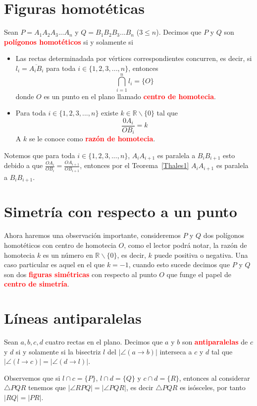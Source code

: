 \section{Figuras homotéticas}
\begin{df}\label{PHdf}
Sean $P=A_{1}A_{2}A_{3}...A_{n}$ y $Q=B_{1}B_{2}B_{3}...B_{n}$ ($3\leq n$). 
Decimos que $P$ y $Q$ son \textcolor{red}{\bf polígonos homotéticos} si y solamente si
\begin{itemize}
\item Las rectas determinadada por vértices correspondientes concurren, es decir, si $l_{i}=\overline{A_{i}B_{i}}$ para toda $i\in\{1,2,3,...,n\}$, entonces 
$$\bigcap_{i=1}^{n}l_{i}=\{O\}$$
donde $O$ es un punto en el plano llamado \textcolor{red}{\bf centro de homotecia}.
\item Para toda $i\in\{1,2,3,...,n\}$ existe $k\in\mathbb{R}\backslash\{0\}$ tal que
$$\frac{0A_{i}}{OB_{i}}=k$$
A $k$ se le conoce como \textcolor{red}{\bf razón de homotecia}.
\end{itemize}
\end{df}

Notemos que para toda $i\in\{1,2,3,...,n\}$, $A_{i}A_{i+1}$ es paralela a $B_{i}B_{i+1}$
esto debido a que $\frac{OA_{i}}{OB_{i}}=\frac{OA_{i+1}}{OB_{i+1}}$, entonces por el Teorema~\ref{Thales1} $A_{i}A_{i+1}$ es paralela a $B_{i}B_{i+1}$.

\section{Simetría con respecto a un punto}

Ahora haremos una observación importante, consideremos $P$ y $Q$ dos polígonos homotéticos con centro de homotecia $O$, como el lector podrá notar, la razón de homotecia $k$ es un número en $\mathbb{R}\backslash \{0\}$, es decir, $k$ puede positiva o negativa. 
Una caso particular es aquel en el que $k=-1$, cuando esto sucede decimos que $P$ y $Q$ son dos \textcolor{red}{\bf figuras simétricas} con respecto al punto $O$ que funge el papel de \textcolor{red}{\bf centro de simetría}.

\section{Líneas antiparalelas}
\begin{df}
Sean $a,b,c,d$ cuatro rectas en el plano. Decimos que $a$ y $b$ son \textcolor{red}{\bf antiparalelas} de $c$ y $d$ si y solamente si la bisectriz  $l$ del $|\angle(a\longrightarrow b)|$ interseca a $c$ y $d$ tal que $|\angle(l\longrightarrow c)|=|\angle(d\longrightarrow l)|$.
\end{df}
Observemos que si $l\cap c=\{P\}$, $l\cap d=\{Q\}$ y $c\cap d=\{R\}$, entonces al considerar $\triangle PQR$ tenemos que $|\angle RPQ|=|\angle PQR|$, es decir $\triangle PQR$ es isósceles, por tanto $|RQ|=|PR|$. 

